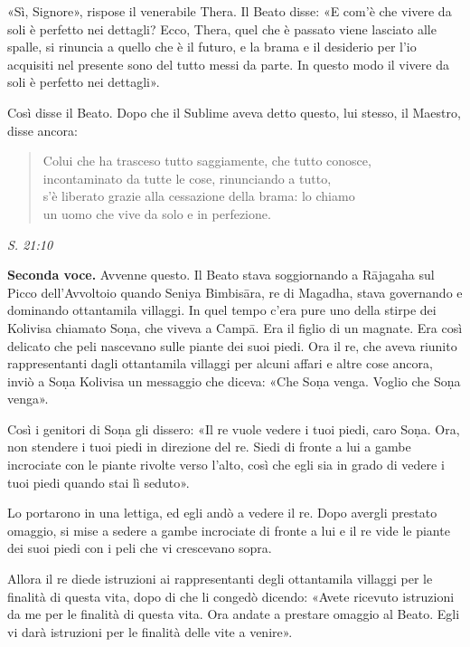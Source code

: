 «Sì, Signore», rispose il venerabile Thera. Il Beato disse: «E com’è che
vivere da soli è perfetto nei dettagli? Ecco, Thera, quel che è passato
viene lasciato alle spalle, si rinuncia a quello che è il futuro, e la
brama e il desiderio per l’io acquisiti nel presente sono del tutto
messi da parte. In questo modo il vivere da soli è perfetto nei
dettagli».


Così disse il Beato. Dopo che il Sublime aveva detto questo, lui stesso,
il Maestro, disse ancora:


\begin{quotation}
Colui che ha trasceso tutto saggiamente, che tutto conosce, \\
incontaminato da tutte le cose, rinunciando a tutto, \\
s’è liberato grazie alla cessazione della brama: lo chiamo \\
un uomo che vive da solo e in perfezione.
\end{quotation}

\emph{S. 21:10}


\textbf{Seconda voce.} Avvenne questo. Il Beato stava soggiornando a Rājagaha sul
Picco dell’Avvoltoio quando Seniya Bimbisāra, re di Magadha, stava
governando e dominando ottantamila villaggi. In quel tempo c’era pure
uno della stirpe dei Kolivisa chiamato Soṇa, che viveva a Campā. Era il
figlio di un magnate. Era così delicato che peli nascevano sulle piante
dei suoi piedi. Ora il re, che aveva riunito rappresentanti dagli
ottantamila villaggi per alcuni affari e altre cose ancora, inviò a Soṇa
Kolivisa un messaggio che diceva: «Che Soṇa venga. Voglio che Soṇa
venga».


Così i genitori di Soṇa gli dissero: «Il re vuole vedere i tuoi piedi,
caro Soṇa. Ora, non stendere i tuoi piedi in direzione del re. Siedi di
fronte a lui a gambe incrociate con le piante rivolte verso l’alto, così
che egli sia in grado di vedere i tuoi piedi quando stai lì seduto».


Lo portarono in una lettiga, ed egli andò a vedere il re. Dopo avergli
prestato omaggio, si mise a sedere a gambe incrociate di fronte a lui e
il re vide le piante dei suoi piedi con i peli che vi crescevano sopra.


Allora il re diede istruzioni ai rappresentanti degli ottantamila
villaggi per le finalità di questa vita, dopo di che li congedò dicendo:
«Avete ricevuto istruzioni da me per le finalità di questa vita. Ora
andate a prestare omaggio al Beato. Egli vi darà istruzioni per le
finalità delle vite a venire».


